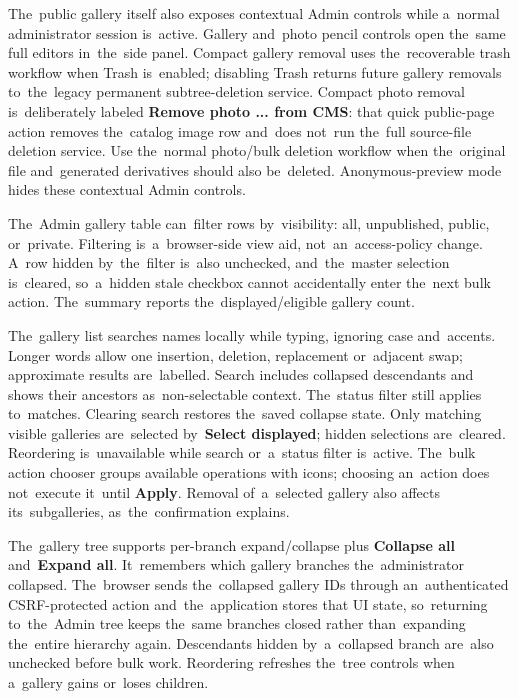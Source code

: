 \documentclass[11pt,a4paper]{article}
\newcommand{\ui}[1]{\textbf{#1}}
\begin{document}
The~public gallery itself also exposes contextual Admin controls while a~normal
administrator session is~active. Gallery and~photo pencil controls open the~same
full editors in~the~side panel. Compact gallery removal uses the~recoverable
trash workflow when Trash is~enabled; disabling Trash returns future gallery
removals to~the~legacy permanent subtree-deletion service. Compact photo removal
is~deliberately labeled \ui{Remove photo ... from CMS}: that quick public-page
action removes the~catalog image row and~does not~run the~full source-file
deletion service. Use the~normal photo/bulk deletion workflow when the~original
file and~generated derivatives should also be~deleted. Anonymous-preview mode
hides these contextual Admin controls.

The~Admin gallery table can~filter rows by~visibility: all, unpublished, public,
or~private. Filtering is~a~browser-side view aid, not~an~access-policy change.
A~row hidden by~the~filter is~also unchecked, and~the~master selection
is~cleared, so~a~hidden stale checkbox cannot accidentally enter the~next bulk
action. The~summary reports the~displayed/eligible gallery count.

The~gallery list searches names locally while typing, ignoring case and~accents.
Longer words allow one insertion, deletion, replacement or~adjacent swap;
approximate results are~labelled. Search includes collapsed descendants and
shows their ancestors as~non-selectable context. The~status filter still applies
to~matches. Clearing search restores the~saved collapse state. Only matching
visible galleries are~selected by~\ui{Select displayed}; hidden selections
are~cleared. Reordering is~unavailable while search or~a~status filter is~active.
The~bulk action chooser groups available operations with icons; choosing an~action
does not~execute it~until \ui{Apply}. Removal of~a~selected gallery also affects
its~subgalleries, as~the~confirmation explains.

The~gallery tree supports per-branch expand/collapse plus \ui{Collapse all}
and~\ui{Expand all}. It~remembers which gallery branches the~administrator
collapsed. The~browser sends the~collapsed gallery IDs through an~authenticated
CSRF-protected action and~the~application stores that UI state, so~returning
to~the~Admin tree keeps the~same branches closed rather than~expanding
the~entire hierarchy again. Descendants hidden by~a~collapsed branch are~also
unchecked before bulk work. Reordering refreshes the~tree controls when
a~gallery gains or~loses children.
\end{document}
